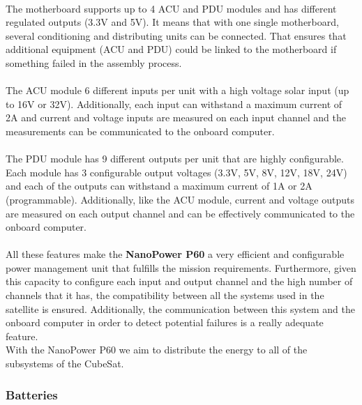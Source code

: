 \paragraph{}The motherboard supports up to 4 ACU and PDU modules and has different regulated outputs (3.3V and 5V). It means that with one single motherboard, several conditioning and distributing units can be connected. That ensures that additional equipment (ACU and PDU) could be linked to the motherboard if something failed in the assembly process.

\paragraph{}The ACU module 6 different inputs per unit with a high voltage solar input (up to 16V or 32V). Additionally, each input can withstand a maximum current of 2A and current and voltage inputs are measured on each input channel and the measurements can be communicated to the onboard computer.

\paragraph{}The PDU module has 9 different outputs per unit that are highly configurable. Each module has 3 configurable output voltages (3.3V, 5V, 8V, 12V, 18V, 24V) and each of the outputs can withstand a maximum current of 1A or 2A (programmable). Additionally, like the ACU module, current and voltage outputs are measured on each output channel and can be effectively communicated to the onboard computer.

\paragraph{}All these features make the \textbf{NanoPower P60} a very efficient and configurable power management unit that fulfills the mission requirements. Furthermore, given this capacity to configure each input and output channel and the high number of channels that it has, the compatibility between all the systems used in the satellite is ensured. Additionally, the communication between this system and the onboard computer in order to detect potential failures is a really adequate feature.\\
With the NanoPower P60 we aim to distribute the energy to all of the subsystems of the CubeSat.

\subsubsection{Batteries}

